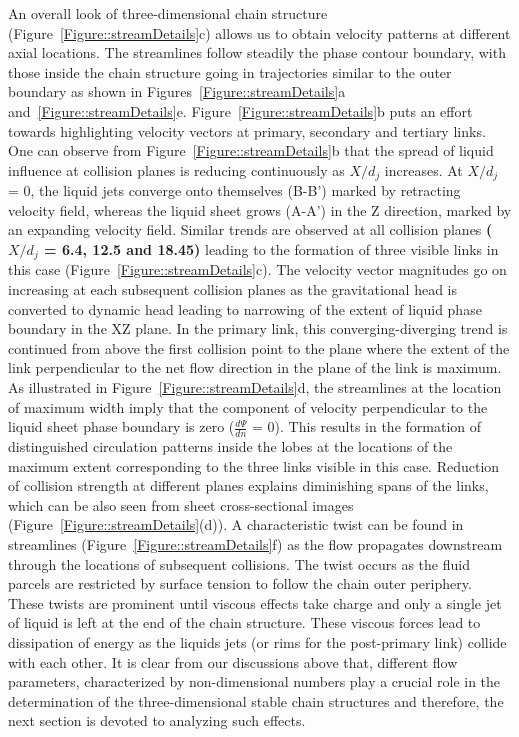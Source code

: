 \documentclass{jfm}
\begin{document}
An overall look of three-dimensional chain structure (Figure~\ref{Figure::streamDetails}c) allows us to obtain velocity patterns at different axial locations. The streamlines follow steadily the phase contour boundary, with those inside the chain structure going in trajectories similar to the outer boundary as shown in Figures~\ref{Figure::streamDetails}a and~\ref{Figure::streamDetails}e. Figure~\ref{Figure::streamDetails}b puts an effort towards highlighting velocity vectors at primary, secondary and tertiary links. One can observe from Figure~\ref{Figure::streamDetails}b that the spread of liquid influence at collision planes is reducing continuously as $X/d_j$ increases.  At $X/d_j$ = 0, the liquid jets converge onto themselves (B-B') marked by retracting velocity field, whereas the liquid sheet grows (A-A') in the Z direction, marked by an expanding velocity field. Similar trends are observed at all collision planes \textbf{($X/d_j$ = 6.4, 12.5 and 18.45)} leading to the formation of three visible links in this case (Figure~\ref{Figure::streamDetails}c). The velocity vector magnitudes go on increasing at each subsequent collision planes as the gravitational head is converted to dynamic head leading to narrowing of the extent of liquid phase boundary in the XZ plane. In the primary link, this converging-diverging trend is continued from above the first collision point to the plane where the extent of the link perpendicular to the net flow direction in the plane of the link is maximum. As illustrated in Figure~\ref{Figure::streamDetails}d, the streamlines at the location of maximum width imply that the component of velocity perpendicular to the liquid sheet phase boundary is zero ($\frac{d\Psi}{dn}$ = 0). This results in the formation of distinguished circulation patterns inside the lobes at the locations of the maximum extent corresponding to the three links visible in this case. Reduction of collision strength at different planes explains diminishing spans of the links, which can be also seen from sheet cross-sectional images (Figure~\ref{Figure::streamDetails}(d)). A characteristic twist can be found in streamlines (Figure~\ref{Figure::streamDetails}f) as the flow propagates downstream through the locations of subsequent collisions. The twist occurs as the fluid parcels are restricted by surface tension to follow the chain outer periphery. These twists are prominent until viscous effects take charge and only a single jet of liquid is left at the end of the chain structure. These viscous forces lead to dissipation of energy as the liquids jets (or rims for the post-primary link) collide with each other. It is clear from our discussions above that, different flow parameters, characterized by non-dimensional numbers play a crucial role in the determination of the three-dimensional stable chain structures and therefore, the next section is devoted to analyzing such effects.
\end{document}
